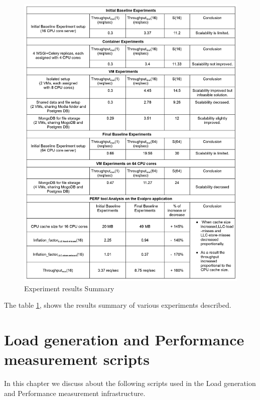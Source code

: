 \documentclass{iitbreport}
\begin{document}
\begin{figure}[!htb]
  \centering
  \includegraphics[width=\linewidth]{Images/experiment_summary.jpg}
  \caption{Experiment results Summary }
  \label{paper_summary}
\end{figure}

The table \ref{paper_summary}, shows the results summary of various experiments described.




\appendix
\chapter{Load generation and Performance measurement scripts }
In this chapter we discuss about the following  scripts used in the Load generation and Performance measurement infrastructure.
\end{document}
